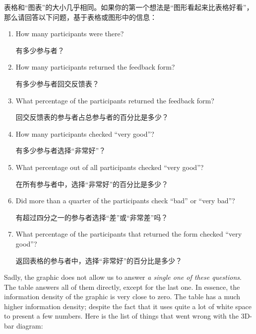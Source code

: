 表格和“图表”的大小几乎相同。如果你的第一个想法是“图形看起来比表格好看”，那么请回答以下问题，基于表格或图形中的信息：
%
\begin{enumerate}
    \item How many participants were there?

    有多少参与者？
    \item How many participants returned the feedback form?

    有多少参与者回交反馈表？
    \item What percentage of the participants returned the feedback form?

    回交反馈表的参与者占总参与者的百分比是多少？
    \item How many participants checked ``very good''?

    有多少参与者选择“非常好”？
    \item What percentage out of all participants checked ``very good''?

    在所有参与者中，选择“非常好”的百分比是多少？
    \item Did more than a quarter of the participants check ``bad'' or ``very
        bad''?

        有超过四分之一的参与者选择“差”或“非常差”吗？
    \item What percentage of the participants that returned the form checked
        ``very good''?

        返回表格的参与者中，选择“非常好”的百分比是多少？
\end{enumerate}

Sadly, the graphic does not allow us to answer \emph{a single one of these
questions}. The table answers all of them directly, except for the last one. In
essence, the information density of the graphic is very close to zero. The
table has a much higher information density; despite the fact that it uses
quite a lot of white space to present a few numbers. Here is the list of things
that went wrong with the 3D-bar diagram:


